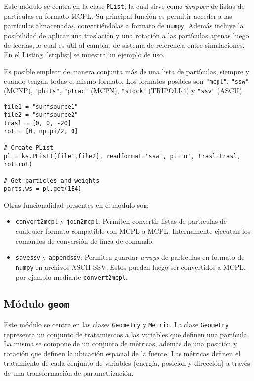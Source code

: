 Este módulo se centra en la clase \verb|PList|, la cual sirve como \emph{wrapper} de listas de partículas en formato MCPL. Su principal función es permitir acceder a las partículas almacenadas, convirtiéndolas a formato de \verb|numpy|. Además incluye la posibilidad de aplicar una traslación y una rotación a las partículas apenas luego de leerlas, lo cual es útil al cambiar de sistema de referencia entre simulaciones. En el Listing \ref{lst:plist} se muestra un ejemplo de uso.

Es posible emplear de manera conjunta más de una lista de partículas, siempre y cuando tengan todas el mismo formato. Los formatos posibles son \verb|"mcpl"|, \verb|"ssw"| (MCNP), \verb|"phits"|, \verb|"ptrac"| (MCPN), \verb|"stock"| (TRIPOLI-4) y \verb|"ssv"| (ASCII).

\begin{lstlisting}[language=Python2, label={lst:plist}, caption=Ejemplo de uso de \texttt{PList}.]
file1 = "surfsource1"
file2 = "surfsource2"
trasl = [0, 0, -20]
rot = [0, np.pi/2, 0]

# Create PList
pl = ks.PList([file1,file2], readformat='ssw', pt='n', trasl=trasl, rot=rot)

# Get particles and weights
parts,ws = pl.get(1E4)
\end{lstlisting}

Otras funcionalidad presentes en el módulo son:
\begin{itemize}
	\item \verb|convert2mcpl| y \verb|join2mcpl|: Permiten convertir listas de partículas de cualquier formato compatible con MCPL a MCPL. Internamente ejecutan los comandos de conversión de línea de comando.
	\item \verb|savessv| y \verb|appendssv|: Permiten guardar \emph{arrays} de partículas en formato de \verb|numpy| en archivos ASCII SSV. Estos pueden luego ser convertidos a MCPL, por ejemplo mediante \verb|convert2mcpl|.
\end{itemize}


\subsection{Módulo \texttt{geom}}

Este módulo se centra en las clases \verb|Geometry| y \verb|Metric|. La clase \verb|Geometry| representa un conjunto de tratamientos a las variables que definen una partícula. La misma se compone de un conjunto de métricas, además de una posición y rotación que definen la ubicación espacial de la fuente. Las métricas definen el tratamiento de cada conjunto de variables (energía, posición y dirección) a través de una transformación de parametrización.

